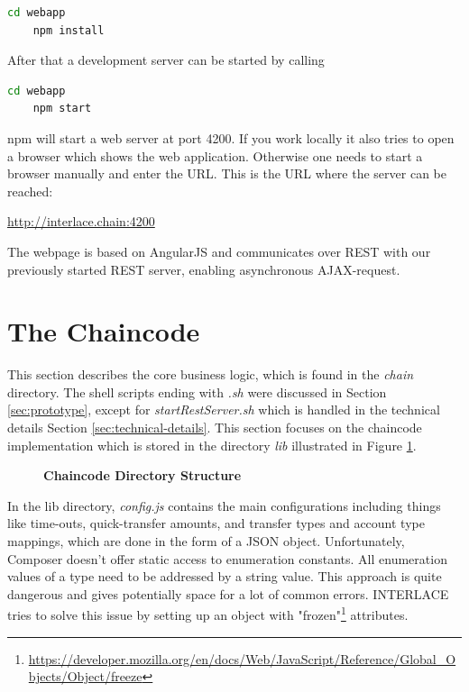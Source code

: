 \begin{lstlisting}[language=bash]
	cd webapp
	npm install
\end{lstlisting}

After that a development server can be started by calling

\begin{lstlisting}[language=bash]
	cd webapp
	npm start
\end{lstlisting}

npm will start a web server at port 4200. If you work locally it also tries to open a browser which shows the web application. Otherwise one needs to start a browser manually and enter the URL. This is the URL where the server can be reached:

\url{http://interlace.chain:4200}

The webpage is based on AngularJS and communicates over REST with our previously started REST server, enabling asynchronous AJAX-request.

\section{The Chaincode}
\label{sec:chaincode}

This section describes the core business logic, which is found in the \textit{chain} directory. The shell scripts ending with \textit{.sh} were discussed in Section \ref{sec:prototype}, except for \textit{startRestServer.sh} which is handled in the technical details Section \ref{sec:technical-details}. This section focuses on the chaincode implementation which is stored in the directory \textit{lib} illustrated in Figure \ref{fig:chain-structure}.

\begin{figure}[htbp]
\centering
\begin{minipage}{5cm}
\end{minipage}
\caption{\bf\small Chaincode Directory Structure}
\label{fig:chain-structure}
\end{figure}


In the lib directory, \textit{config.js} contains the main configurations including things like time-outs, quick-transfer amounts, and transfer types and account type mappings, which are done in the form of a JSON object. Unfortunately, Composer doesn't offer static access to enumeration constants. All enumeration values of a type need to be addressed by a string value. This approach is quite dangerous and gives potentially space for a lot of common errors. INTERLACE tries to solve this issue by setting up an object with "frozen"\footnote{\url{https://developer.mozilla.org/en/docs/Web/JavaScript/Reference/Global_Objects/Object/freeze}} attributes.

